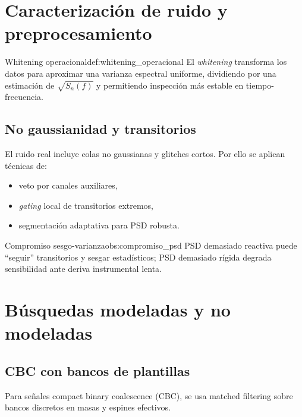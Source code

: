 \section{Caracterización de ruido y preprocesamiento}
\label{sec:caracterizacion_preprocesamiento}

\begin{definicion}{Whitening operacional}{def:whitening_operacional}
El \emph{whitening} transforma los datos para aproximar una varianza espectral uniforme, dividiendo por una estimación de $\sqrt{S_n(f)}$ y permitiendo inspección más estable en tiempo-frecuencia.
\end{definicion}

\subsection{No gaussianidad y transitorios}

El ruido real incluye colas no gaussianas y glitches cortos. Por ello se aplican técnicas de:
\begin{itemize}[leftmargin=2em]
  \item veto por canales auxiliares,
  \item \emph{gating} local de transitorios extremos,
  \item segmentación adaptativa para PSD robusta.
\end{itemize}

\begin{observacion}{Compromiso sesgo-varianza}{obs:compromiso_psd}
PSD demasiado reactiva puede ``seguir'' transitorios y sesgar estadísticos; PSD demasiado rígida degrada sensibilidad ante deriva instrumental lenta.
\end{observacion}

\section{Búsquedas modeladas y no modeladas}
\label{sec:busquedas_modeladas_nomodeladas}

\subsection{CBC con bancos de plantillas}

Para señales compact binary coalescence (CBC), se usa matched filtering sobre bancos discretos en masas y espines efectivos.


